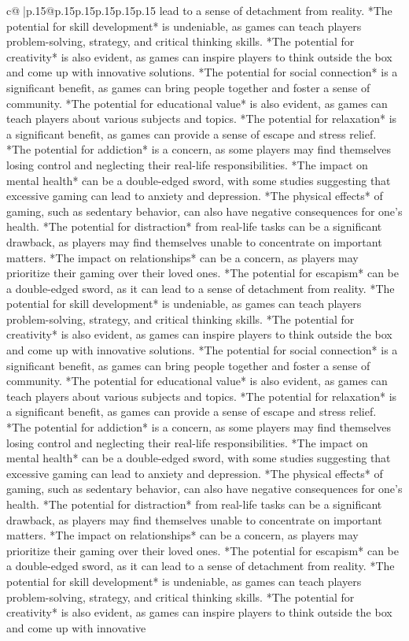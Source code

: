 \documentclass{article}
\begin{document}
{\begin{supertabular}{c@{$\;$}|p{.15\linewidth}@{}p{.15\linewidth}p{.15\linewidth}p{.15\linewidth}p{.15\linewidth}p{.15\linewidth}}
{{{lead to a sense of detachment from reality. *The potential for skill development* is undeniable, as games can teach players problem{-}solving, strategy, and critical thinking skills. *The potential for creativity* is also evident, as games can inspire players to think outside the box and come up with innovative solutions. *The potential for social connection* is a significant benefit, as games can bring people together and foster a sense of community. *The potential for educational value* is also evident, as games can teach players about various subjects and topics. *The potential for relaxation* is a significant benefit, as games can provide a sense of escape and stress relief. *The potential for addiction* is a concern, as some players may find themselves losing control and neglecting their real{-}life responsibilities. *The impact on mental health* can be a double{-}edged sword, with some studies suggesting that excessive gaming can lead to anxiety and depression. *The physical effects* of gaming, such as sedentary behavior, can also have negative consequences for one's health. *The potential for distraction* from real{-}life tasks can be a significant drawback, as players may find themselves unable to concentrate on important matters. *The impact on relationships* can be a concern, as players may prioritize their gaming over their loved ones. *The potential for escapism* can be a double{-}edged sword, as it can lead to a sense of detachment from reality. *The potential for skill development* is undeniable, as games can teach players problem{-}solving, strategy, and critical thinking skills. *The potential for creativity* is also evident, as games can inspire players to think outside the box and come up with innovative solutions. *The potential for social connection* is a significant benefit, as games can bring people together and foster a sense of community. *The potential for educational value* is also evident, as games can teach players about various subjects and topics. *The potential for relaxation* is a significant benefit, as games can provide a sense of escape and stress relief. *The potential for addiction* is a concern, as some players may find themselves losing control and neglecting their real{-}life responsibilities. *The impact on mental health* can be a double{-}edged sword, with some studies suggesting that excessive gaming can lead to anxiety and depression. *The physical effects* of gaming, such as sedentary behavior, can also have negative consequences for one's health. *The potential for distraction* from real{-}life tasks can be a significant drawback, as players may find themselves unable to concentrate on important matters. *The impact on relationships* can be a concern, as players may prioritize their gaming over their loved ones. *The potential for escapism* can be a double{-}edged sword, as it can lead to a sense of detachment from reality. *The potential for skill development* is undeniable, as games can teach players problem{-}solving, strategy, and critical thinking skills. *The potential for creativity* is also evident, as games can inspire players to think outside the box and come up with innovative }}}
\end{supertabular}}
\end{document}
